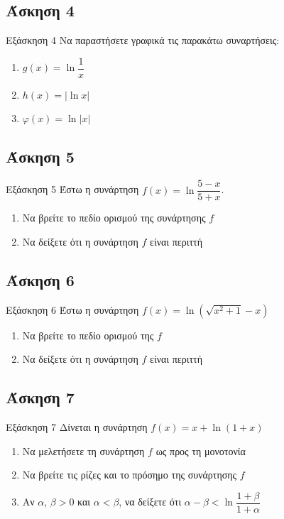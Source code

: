 \documentclass[greek]{beamer}
\begin{document}
\subsection{Άσκηση 4}
\begin{frame}[label=Άσκηση4,t]{Εξάσκηση 4}
 Να παραστήσετε γραφικά τις παρακάτω συναρτήσεις:
 \begin{enumerate}
  \item<1-> $g(x)=\ln \dfrac{1}{x}$
  \item<2-> $h(x)=|\ln x|$
  \item<3-> $φ(x)=\ln |x|$
 \end{enumerate}

\end{frame}

\subsection{Άσκηση 5}
\begin{frame}[label=Άσκηση5,t]{Εξάσκηση 5}
 Έστω η συνάρτηση $f(x)=\ln \dfrac{5-x}{5+x}$.
 \begin{enumerate}
  \item<1-> Να βρείτε το πεδίο ορισμού της συνάρτησης $f$
  \item<2-> Να δείξετε ότι η συνάρτηση $f$ είναι περιττή
 \end{enumerate}

\end{frame}

\subsection{Άσκηση 6}
\begin{frame}[label=Άσκηση6,t]{Εξάσκηση 6}
 Έστω η συνάρτηση $f(x)=\ln \left( \sqrt{x^2+1}-x \right) $
 \begin{enumerate}
  \item<1-> Να βρείτε το πεδίο ορισμού της $f$
  \item<2-> Να δείξετε ότι η συνάρτηση $f$ είναι περιττή
 \end{enumerate}

\end{frame}

\subsection{Άσκηση 7}
\begin{frame}[label=Άσκηση7,t]{Εξάσκηση 7}
 Δίνεται η συνάρτηση $f(x)=x+\ln(1+x)$
 \begin{enumerate}
  \item<1-> Να μελετήσετε τη συνάρτηση $f$ ως προς τη μονοτονία
  \item<2-> Να βρείτε τις ρίζες και το πρόσημο της συνάρτησης $f$
  \item<3-> Αν $α$, $β>0$ και $α<β$, να δείξετε ότι $α-β<\ln \dfrac{1+β}{1+α}$
 \end{enumerate}

\end{frame}
\end{document}
